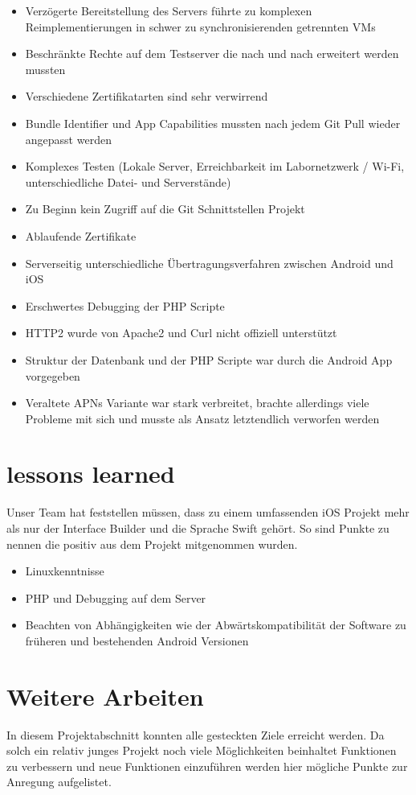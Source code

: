 \begin{itemize}
\item Verzögerte Bereitstellung des Servers führte zu komplexen Reimplementierungen in schwer zu synchronisierenden getrennten VMs
\item Beschränkte Rechte auf dem Testserver die nach und nach erweitert werden mussten
\item Verschiedene Zertifikatarten sind sehr verwirrend
\item Bundle Identifier und App Capabilities mussten nach jedem Git Pull wieder angepasst werden
\item Komplexes Testen (Lokale Server, Erreichbarkeit im Labornetzwerk / Wi-Fi, unterschiedliche Datei- und Serverstände) 
\item Zu Beginn kein Zugriff auf die Git Schnittstellen Projekt
\item Ablaufende Zertifikate
\item Serverseitig unterschiedliche Übertragungsverfahren zwischen Android und iOS
\item Erschwertes Debugging der PHP Scripte
\item HTTP2 wurde von Apache2 und Curl nicht offiziell unterstützt
\item Struktur der Datenbank und der PHP Scripte war durch die Android App vorgegeben
\item Veraltete APNs Variante war stark verbreitet, brachte allerdings viele Probleme mit sich und musste als Ansatz letztendlich verworfen werden
\end{itemize}


\section{lessons learned}
Unser Team hat feststellen müssen, dass zu einem umfassenden iOS Projekt mehr als nur der Interface Builder und die Sprache Swift gehört. So sind Punkte zu nennen die positiv aus dem Projekt mitgenommen wurden.
\begin{itemize}
\item Linuxkenntnisse
\item PHP und Debugging auf dem Server
\item Beachten von Abhängigkeiten wie der Abwärtskompatibilität der Software zu früheren und bestehenden Android Versionen
\end{itemize}

\section{Weitere Arbeiten}
In diesem Projektabschnitt konnten alle gesteckten Ziele erreicht werden. Da solch ein relativ junges Projekt noch viele Möglichkeiten beinhaltet Funktionen zu verbessern und neue Funktionen einzuführen werden hier mögliche Punkte zur Anregung aufgelistet.

